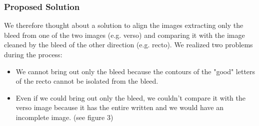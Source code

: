 \documentclass[%
 reprint,
 amsmath,amssymb,
 aps,
]{revtex4-1}
\begin{document}
\subsubsection{Proposed Solution}
We therefore thought about a solution to align the images extracting only the bleed from one of the two images (e.g. verso) and comparing it with the image cleaned by the bleed of the other direction (e.g. recto).
We realized two problems during the process:
\begin{itemize}
  \item We cannot bring out only the bleed because the contours of the "good" letters of the recto cannot be isolated from the bleed.
  \item Even if we could bring out only the bleed, we couldn't compare it with the verso image because it has the entire written and we would have an incomplete image. (see figure 3)
\end{itemize}
\end{document}
